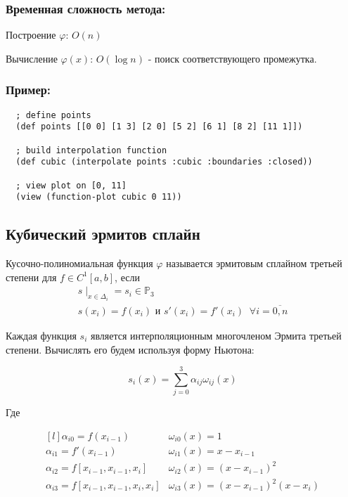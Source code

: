\subsubsection{Временная сложность метода:}

Построение $\varphi$: $O(n)$

Вычисление $\varphi(x)$: $O(\log n)$ - поиск соответствующего промежутка.

\subsubsection{Пример:}

\begin{verbatim}
  ; define points
  (def points [[0 0] [1 3] [2 0] [5 2] [6 1] [8 2] [11 1]])

  ; build interpolation function
  (def cubic (interpolate points :cubic :boundaries :closed))

  ; view plot on [0, 11]
  (view (function-plot cubic 0 11))
\end{verbatim}



\subsection{Кубический эрмитов сплайн}

Кусочно-полиномиальная функция $\varphi$ называется эрмитовым сплайном третьей степени для $f \in C^1[a, b]$, если
\begin{equation}
  \begin{gathered}
    s\mid_{x\in \Delta_i} = s_i \in \mathbb{P}_3 \\
      s(x_i) = f(x_i) \text{ и } s'(x_i) = f'(x_i) \;\; \forall i = \overline{0,n}
  \end{gathered}
\end{equation}

Каждая функция $s_i$ является интерполяционным многочленом Эрмита третьей степени. Вычислять его будем используя форму Ньютона:

\begin{equation}
  s_i(x) = \sum_{j=0}^3 \alpha_{ij} \omega_{ij}(x)
\end{equation}

\noindent Где

\begin{equation}
  \begin{matrix*}[l]
    \alpha_{i0} = f(x_{i-1}) & \omega_{i0}(x) = 1\\
    \alpha_{i1} = f'(x_{i-1}) & \omega_{i1}(x) = x - x_{i-1} \\
    \alpha_{i2} = f[x_{i-1}, x_{i-1}, x_i] & \omega_{i2}(x) = (x - x_{i-1})^2 \\
    \alpha_{i3} = f[x_{i-1}, x_{i-1}, x_i, x_i] & \omega_{i3}(x) =  (x - x_{i-1})^2(x-x_i)
  \end{matrix*}
\end{equation}

